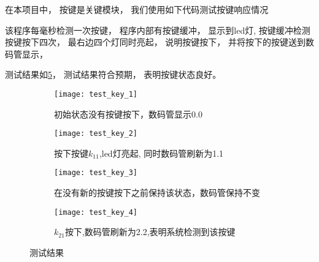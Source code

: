\documentclass[../main.tex]{subfiles} %
\begin{document}
在本项目中，
按键是关键模块，
我们使用如下代码测试按键响应情况



该程序每毫秒检测一次按键，
程序内部有按键缓冲，
显示到led灯,
按键缓冲检测按键按下四次，
最右边四个灯同时亮起，
说明按键按下，
并将按下的按键送到数码管显示，

测试结果如\cref{fig:test_key}，
测试结果符合预期，
表明按键状态良好。

\begin{figure}[H]
  \centering
    \begin{subfigure}[b]{0.2\textwidth}
    \centering
    \texttt{[image: test\_key\_1]}
    \caption{初始状态没有按键按下，数码管显示0.0}
    \label{fig:test_key_1}
  \end{subfigure}
  \hfill
  \begin{subfigure}[b]{0.2\textwidth}
    \centering
    \texttt{[image: test\_key\_2]}
    \caption{按下按键$k_{11}$,led灯亮起,
    同时数码管刷新为1.1}
    \label{fig:three sin x}
  \end{subfigure}
  \hfill
  \begin{subfigure}[b]{0.2\textwidth}
    \centering
    \texttt{[image: test\_key\_3]}
    \caption{在没有新的按键按下之前保持该状态，数码管保持不变}
    \label{fig:five over x}
  \end{subfigure}
  \hfill
  \begin{subfigure}[b]{0.2\textwidth}
    \centering
    \texttt{[image: test\_key\_4]}
    \caption{$k_{21}$按下,数码管刷新为2.2,表明系统检测到该按键}
    \label{fig:five over x}
  \end{subfigure}
  \caption{测试结果}
  \label{fig:test_key}
\end{figure}
\end{document}
